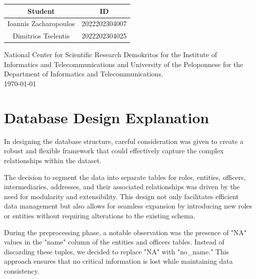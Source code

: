 \documentclass{article}
\begin{document}
\begin{titlepage}
\begin{center}
        \vspace{1cm}
        \renewcommand{\arraystretch}{1.5}
        \begin{tabular}{|c|c|}
            \hline
            \textbf{Student}              & \textbf{ID}           \\
            \hline
            \large{Ioannis Zacharopoulos} & \large{2022202304007} \\
            \hline
            \large{Dimitrios Tselentis}   & \large{2022202304025} \\
            \hline
        \end{tabular}

        \vspace{2cm}

        \textmd{National Center for Scientific Research Demokritos for the Institute of Informatics and Telecommunications and University of the Peloponnese for the Department of Informatics and Telecommunications.} \\[0.5cm]

        \today \\
    \end{center}
\end{titlepage}
\newpage

\onehalfspacing

\section*{\centering Database Design Explanation}

In designing the database structure, careful consideration was given to create a robust and flexible framework that could effectively capture the complex relationships within the dataset.

The decision to segment the data into separate tables for roles, entities, officers, intermediaries, addresses, and their associated relationships was driven by the need for modularity and extensibility. This design not only facilitates efficient data management but also allows for seamless expansion by introducing new roles or entities without requiring alterations to the existing schema.

During the preprocessing phase, a notable observation was the presence of "NA" values in the "name" column of the entities and officers tables. Instead of discarding these tuples, we decided to replace "NA" with "no\_name." This approach ensures that no critical information is lost while maintaining data consistency.
\end{document}
